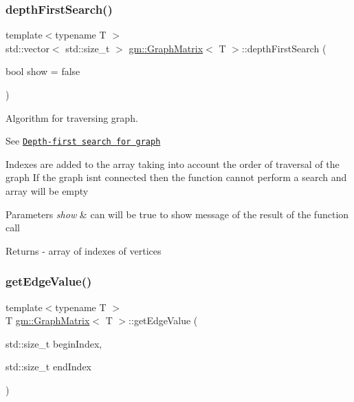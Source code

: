\subsubsection{\texorpdfstring{depth\+First\+Search()}{depthFirstSearch()}}
{\footnotesize\ttfamily template$<$typename T $>$ \\
std\+::vector$<$ std\+::size\+\_\+t $>$ \mbox{\hyperlink{classgm_1_1_graph_matrix}{gm\+::\+Graph\+Matrix}}$<$ T $>$\+::depth\+First\+Search (\begin{DoxyParamCaption}\item[{bool}]{show = {\ttfamily false} }\end{DoxyParamCaption})}



Algorithm for traversing graph. 

See \href{https://en.wikipedia.org/wiki/Depth-first_search}{\tt Depth-\/first search for graph}

Indexes are added to the array taking into account the order of traversal of the graph If the graph isn\textquotesingle{}t connected then the function cannot perform a search and array will be empty 
\begin{DoxyParams}{Parameters}
{\em show} & can will be true to show message of the result of the function call \\
\hline
\end{DoxyParams}
\begin{DoxyReturn}{Returns}
-\/ array of indexes of vertices 
\end{DoxyReturn}
\mbox{\label{classgm_1_1_graph_matrix_a57fbb70b98bfdd89400afaaac7af20ec}} 
\subsubsection{\texorpdfstring{get\+Edge\+Value()}{getEdgeValue()}}
{\footnotesize\ttfamily template$<$typename T $>$ \\
T \mbox{\hyperlink{classgm_1_1_graph_matrix}{gm\+::\+Graph\+Matrix}}$<$ T $>$\+::get\+Edge\+Value (\begin{DoxyParamCaption}\item[{std\+::size\+\_\+t}]{begin\+Index,  }\item[{std\+::size\+\_\+t}]{end\+Index }\end{DoxyParamCaption})}


